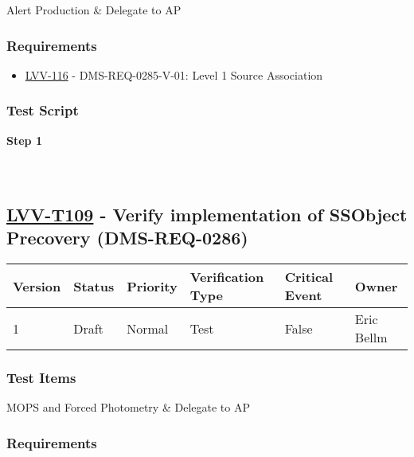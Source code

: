 Alert Production \& Delegate to AP

\hypertarget{requirements-85}{%
\subsubsection{Requirements}\label{requirements-85}}

\begin{itemize}
\tightlist
\item
  \href{https://jira.lsstcorp.org/browse/LVV-116}{LVV-116} -
  DMS-REQ-0285-V-01: Level 1 Source Association
\end{itemize}

\hypertarget{test-script-85}{%
\subsubsection{Test Script}\label{test-script-85}}

\textbf{Step 1}\\
~\\
~\\

\hypertarget{lvv-t109---verify-implementation-of-ssobject-precovery-dms-req-0286}{%
\subsection{\texorpdfstring{\href{https://jira.lsstcorp.org/secure/Tests.jspa\#/testCase/LVV-T109}{LVV-T109}
- Verify implementation of SSObject Precovery
(DMS-REQ-0286)}{LVV-T109 - Verify implementation of SSObject Precovery (DMS-REQ-0286)}}\label{lvv-t109---verify-implementation-of-ssobject-precovery-dms-req-0286}}

\begin{longtable}[]{@{}llllll@{}}
\toprule
Version & Status & Priority & Verification Type & Critical Event &
Owner\tabularnewline
\midrule
\endhead
1 & Draft & Normal & Test & False & Eric Bellm\tabularnewline
\bottomrule
\end{longtable}

\hypertarget{test-items-85}{%
\subsubsection{Test Items}\label{test-items-85}}

MOPS and Forced Photometry \& Delegate to AP

\hypertarget{requirements-86}{%
\subsubsection{Requirements}\label{requirements-86}}

